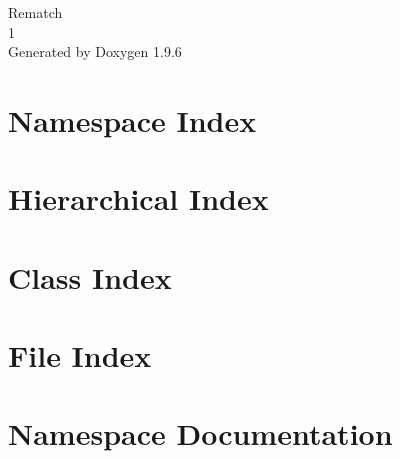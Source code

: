 \documentclass[twoside]{book}
\newcommand{\+}{\discretionary{\mbox{\scriptsize$\hookleftarrow$}}{}{}}
\newcommand{\clearemptydoublepage}{%
    \newpage{\pagestyle{empty}\cleardoublepage}%
  }
\begin{document}
  \raggedbottom
    \hypersetup{pageanchor=false,
                bookmarksnumbered=true,
                pdfencoding=unicode
               }
  \begin{titlepage}
  \vspace*{7cm}
  \begin{center}%
  {\Large Rematch}\\
  [1ex]\large 1 \\
  \vspace*{1cm}
  {\large Generated by Doxygen 1.9.6}\\
  \end{center}
  \end{titlepage}
  \clearemptydoublepage
  \tableofcontents
  \clearemptydoublepage
  \hypersetup{pageanchor=true}
\chapter{Namespace Index}

\chapter{Hierarchical Index}

\chapter{Class Index}

\chapter{File Index}

\chapter{Namespace Documentation}







\end{document}

